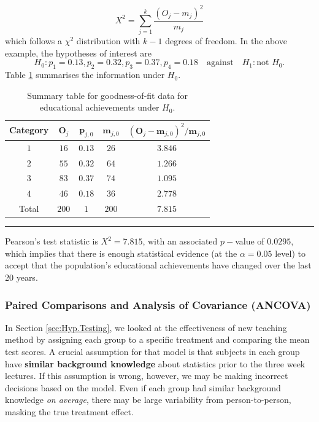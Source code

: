 \begin{equation*}
    X^{2}=\sum_{j=1}^{k}\frac{(O_{j}-m_{j})^{2}}{m_{j}}    
\end{equation*}
which follows a $\chi^{2}$ distribution with $k-1$ degrees of freedom.
\newl In the above example, the hypotheses of interest are $$H_{0}: p_{1}=0.13,p_{2}=0.32,p_{3}=0.37,p_{4}=0.18\quad\mbox{against}\quad H_{1}: \text{not } H_{0}.$$ Table  \ref{tab:SA7} summarises the information under $H_{0}$.
     \begin{table}[!t]
         \centering
         \begin{tabular}{c c c c c}
         \hline
        \textbf{Category} & $\bm{O}_{j}$ & $\bm{p}_{j,0}$ & $\bm{m}_{j,0}$ & $(\bm{O}_{j}-\bm{m}_{j,0})^2/\bm{m}_{j,0}$  \\
         \hline
        $1$ & $16$ & $0.13$ & $26$ & $3.846$ \\
        $2$ & $55$ & $0.32$ & $64$ & $1.266$ \\
        $3$ & $83$ & $0.37$ & $74$ & $1.095$ \\
        $4$ & $46$ & $0.18$ & $36$ & $2.778$ \\
        \hline
        Total & $200$ & $1$ & $200$ & $7.815$\\
        \hline
         \end{tabular}
         \caption[\small Summary table for goodness-of-fit data for educational achievements]{\small Summary table for goodness-of-fit data for educational achievements under $H_0$.}
         \label{tab:SA7}\hrule
     \end{table}
Pearson's test statistic is $X^{2}=7.815$, with an associated $p-$value of $0.0295$, which implies that there is enough statistical  evidence (at the $\alpha=0.05$ level) to accept that the population's educational achievements have changed over the last 20 years.



\subsubsection{Paired Comparisons and Analysis of Covariance (ANCOVA)}
In Section \ref{sec:Hyp.Testing}, we looked at the effectiveness of new teaching method by assigning each group to a specific treatment and comparing the mean test scores. A crucial assumption for that model is that subjects in each group have \textbf{similar background knowledge} about statistics prior to the three week lectures. If this assumption is wrong, however, we may be making incorrect decisions based on the model. Even if each group had similar background knowledge \textit{on average}, there may be large variability from person-to-person, masking the true treatment effect.

